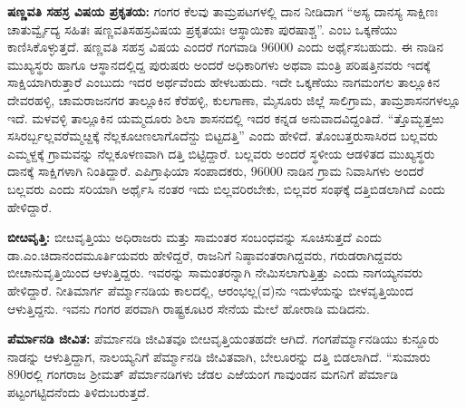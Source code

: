 \textbf{ಷಣ್ಣವತಿ ಸಹಸ್ರ ವಿಷಯ ಪ್ರಕೃತಯ:} ಗಂಗರ ಕೆಲವು ತಾಮ್ರಪಟಗಳಲ್ಲಿ ದಾನ ನೀಡಿದಾಗ “ಅಸ್ಯ ದಾನಸ್ಯ ಸಾಕ್ಷಿಣಃ ಚಾತುರ್ವ್ವೈದ್ಯ ಸಹಿತಃ ಷಣ್ಣವತಿಸಹಸ್ರವಿಷಯ ಪ್ರಕೃತಯಃ ಆಸ್ಥಾಯಿಕಾ ಪುರಷಾಶ್ಚ”. ಎಂಬ ಒಕ್ಕಣೆಯು ಕಾಣಿಸಿಕೊಳ್ಳುತ್ತದೆ. ಷಣ್ಣವತಿ ಸಹಸ್ರ ವಿಷಯ ಎಂದರೆ ಗಂಗವಾಡಿ 96000 ಎಂದು ಅರ್ಥೈಸಬಹುದು. ಈ ನಾಡಿನ ಮುಖ್ಯಸ್ಥರು ಹಾಗೂ ಆಸ್ಥಾನದಲ್ಲಿದ್ದ ಪುರುಷರು ಅಂದರೆ ಅಧಿಕಾರಿಗಳು ಅಥವಾ ಮಂತ್ರಿ ಪರಿಷತ್ತಿನವರು ಇದಕ್ಕೆ ಸಾಕ್ಷಿಯಾಗಿರುತ್ತಾರೆ ಎಂಬುದು ಇದರ ಅರ್ಥವೆಂದು ಹೇಳಬಹುದು. ಇದೇ ಒಕ್ಕಣೆಯು ನಾಗಮಂಗಲ ತಾಲ್ಲೂಕಿನ ದೇವರಹಳ್ಳಿ, ಚಾಮರಾಜನಗರ ತಾಲ್ಲೂಕಿನ ಕೆರೆಹಳ್ಳಿ, ಕುಲಗಾಣಾ, ಮೈಸೂರು ಜಿಲ್ಲೆ ಸಾಲಿಗ್ರಾಮ, ತಾಮ್ರಶಾಸನಗಳಲ್ಲೂ ಇದೆ. ಮಳವಳ್ಳಿ ತಾಲ್ಲೂಕಿನ ಯಮ್ಮದೂರು ಶಿಲಾ ಶಾಸನದಲ್ಲಿ ಇದರ ಕನ್ನಡ ಅನುವಾದವಿದ್ದಂತಿದೆ. “ತ್ತೊಮ್ಭತ್ತಱು ಸಸಿರರ್ಬ್ಬಲ್ಲವರೆಮ್ಮೞ್ದಕ್ಕೆ ನೆಲ್ಲಕೂೞಣಲಾಗೊದೆನ್ದು ಬಿಟ್ಟದತ್ತಿ” ಎಂದು ಹೇಳಿದೆ. ತೊಂಬತ್ತರುಸಾಸಿರದ ಬಲ್ಲವರು ಎಮ್ಮಳ್ದಕ್ಕೆ ಗ್ರಾಮವನ್ನು ನೆಲ್ಲಕೂಳಣವಾಗಿ ದತ್ತಿ ಬಿಟ್ಟಿದ್ದಾರೆ. ಬಲ್ಲವರು ಅಂದರೆ ಸ್ಥಳೀಯ ಆಡಳಿತದ ಮುಖ್ಯಸ್ಥರು ದಾನಕ್ಕೆ ಸಾಕ್ಷಿಗಳಾಗಿ ನಿಂತಿದ್ದಾರೆ. ಎಪಿಗ್ರಾಫಿಯಾ ಸಂಪಾದಕರು, 96000 ನಾಡಿನ ಗ್ರಾಮ ನಿವಾಸಿಗಳು ಅಂದರೆ ಬಲ್ಲವರು ಎಂದು ಸರಿಯಾಗಿ ಅರ್ಥೈಸಿ ನಂತರ ಇದು ಬಿಲ್ಲವರಿರಬೇಕು, ಬಿಲ್ಲವರ ಸಂಘಕ್ಕೆ ದತ್ತಿಬಿಡಲಾಗಿದೆ ಎಂದು ಹೇಳಿದ್ದಾರೆ.

\textbf{ಬೀೞವೃತ್ತಿ:} ಬೀೞವೃತ್ತಿಯು ಅಧಿರಾಜರು ಮತ್ತು ಸಾಮಂತರ ಸಂಬಂಧವನ್ನು ಸೂಚಿಸುತ್ತದೆ ಎಂದು ಡಾ.ಎಂ.\-ಚಿದಾನಂದಮೂರ್ತಿಯವರು ಹೇಳಿದ್ದರೆ, ರಾಜನಿಗೆ ನಿಷ್ಠಾವಂತರಾಗಿದ್ದವರು, ಗರುಡರಾಗಿದ್ದವರು ಬೀೞಾನುವೃತ್ತಿಯಿಂದ ಆಳುತ್ತಿದ್ದರು. ಇವರನ್ನು ಸಾಮಂತರನ್ನಾಗಿ ನೇಮಿಸಲಾಗುತ್ತಿತ್ತು ಎಂದು ನಾಗಯ್ಯನವರು ಹೇಳಿದ್ದಾರೆ. ನೀತಿಮಾರ್ಗ ಪೆರ್ಮ್ಮಾನಡಿಯ ಕಾಲದಲ್ಲಿ, ಆರಂಭಲ್ಲ(ವ)ನು ಇದುಳೆಯನ್ನು ಬೀಳವೃತ್ತಿಯಿಂದ ಆಳುತ್ತಿದ್ದನು. ಇವನು ಗಂಗರ ಪರವಾಗಿ ರಾಷ್ಟ್ರಕೂಟರ ಸೇನೆಯ ಮೇಲೆ ಹೋರಾಡಿ ಮಡಿದನು.

\newpage

\textbf{ಪೆರ್ಮಾನಡಿ ಜೀವಿತ:} ಪೆರ್ಮಾನಡಿ ಜೀವಿತವೂ ಬೀೞವೃತ್ತಿಯಂತಹದೇ ಆಗಿದೆ. ಗಂಗಪೆರ್ಮ್ಮಾನಡಿಯು ಕುನ್ದೂರು ನಾಡನ್ನು ಆಳುತ್ತಿದ್ದಾಗ, ನಾಲಯ್ಯನಿಗೆ ಪೆರ್ಮ್ಮಾನಡಿ ಜೀವಿತವಾಗಿ, ಬೇಲೂರನ್ನು ದತ್ತಿ ಬಿಡಲಾಗಿದೆ. “ಸುಮಾರು 890ರಲ್ಲಿ ಗಂಗರಾಜ ಶ‍್ರೀಮತ್​ ಪೆರ್ಮಾನಡಿಗಳು ಜೆಡಲ ಎಱೆಯಂಗ ಗಾವುಂಡನ ಮಗನಿಗೆ ಪೆರ್ಮಾಡಿ ಪಟ್ಟಂಗಟ್ಟಿದನೆಂದು ತಿಳಿದುಬರುತ್ತದೆ.

